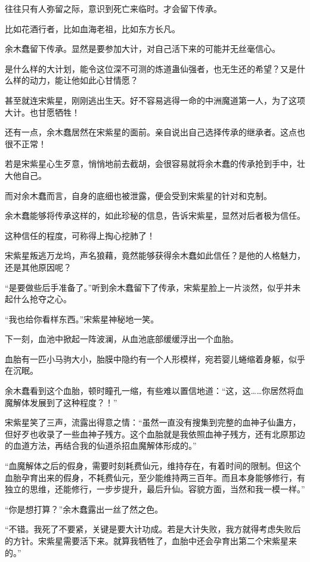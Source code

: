 \begin{this_body}
往往只有人弥留之际，意识到死亡来临时。才会留下传承。

比如花酒行者，比如血海老祖，比如东方长凡。

余木蠢留下传承。显然是要参加大计，对自己活下来的可能并无丝毫信心。

是什么样的大计划，能令这位深不可测的炼道蛊仙强者，也无生还的希望？又是什么样的动力，能让他如此心甘情愿？

甚至就连宋紫星，刚刚逃出生天。好不容易逃得一命的中洲魔道第一人，为了这项大计。也甘愿牺牲！

还有一点，余木蠢居然在宋紫星的面前。亲自说出自己选择传承的继承者。这点也很不正常！

若是宋紫星心生歹意，悄悄地前去截胡，会很容易就将余木蠢的传承抢到手中，壮大他自己。

而对余木蠢而言，自身的底细也被泄露，便会受到宋紫星的针对和克制。

余木蠢能够将传承这样的，如此珍秘的信息，告诉宋紫星，显然对后者极为信任。

这种信任的程度，可称得上掏心挖肺了！

宋紫星叛逃万龙坞，声名狼藉，竟然能够获得余木蠢如此信任？是他的人格魅力，还是其他原因呢？

“是要做些后手准备了。”听到余木蠢留下了传承，宋紫星脸上一片淡然，似乎并未起什么抢夺之心。

“我也给你看样东西。”宋紫星神秘地一笑。

下一刻，血池中掀起一阵波澜，从血池底部缓缓浮出一个血胎。

血胎有一匹小马驹大小，胎膜中隐约有一个人形模样，宛若婴儿蜷缩着身躯，似乎在沉眠。

余木蠢看到这个血胎，顿时瞳孔一缩，有些难以置信地道：“这，这……你居然将血魔解体发展到了这种程度？！”

宋紫星笑了三声，流露出得意之情：“虽然一直没有搜集到完整的血神子仙蛊方，但好歹也收录了一些血神子残方。这个血胎就是我依照血神子残方，还有北原那边的血道方法，再结合我的仙道杀招血魔解体形成的。”

“血魔解体之后的假身，需要时刻耗费仙元，维持存在，有着时间的限制。但这个血胎孕育出来的假身，不耗费仙元，至少能维持两三百年。而且本身能够修行，有独立的思维，还能修行，一步步提升，最后升仙。容貌方面，当然和我一模一样。”

“你是想打算？”余木蠢露出一丝了然之色。

“不错。我死了不要紧，关键是要大计功成。若是大计失败，我方就得考虑失败后的方针。宋紫星需要活下来。就算我牺牲了，血胎中还会孕育出第二个宋紫星来的。”


\end{this_body}
